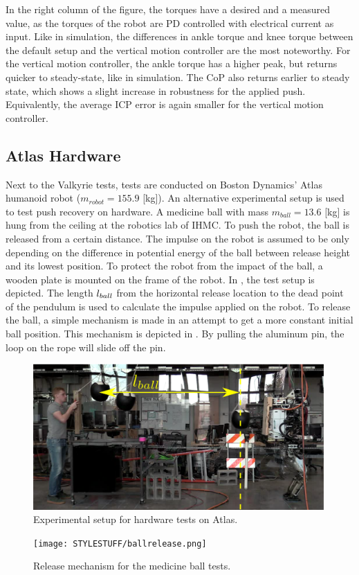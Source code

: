 In the right column of the figure, the torques have a desired and a measured value, as the torques of the robot are PD controlled with electrical current as input. Like in simulation, the differences in ankle torque and knee torque between the default setup and the vertical motion controller are the most noteworthy. For the vertical motion controller, the ankle torque has a higher peak, but returns quicker to steady-state, like in simulation.  The \ac{CoP} also returns earlier to steady state, which shows a slight increase in robustness for the applied push. Equivalently, the average \ac{ICP} error is again smaller for the vertical motion controller.

\subsection{Atlas Hardware}
Next to the Valkyrie tests, tests are conducted on Boston Dynamics' Atlas humanoid robot ($m_{robot}=155.9$ [kg]). An alternative experimental setup is used to test push recovery on hardware. A medicine ball with mass $m_{ball}=13.6$ [kg] is hung from the ceiling at the robotics lab of \ac{IHMC}. To push the robot, the ball is released from a certain distance. The impulse on the robot is assumed to be only depending on the difference in potential energy of the ball between release height and its lowest position. To protect the robot from the impact of the ball, a wooden plate is mounted on the frame of the robot. In , the test setup is depicted. The length $l_{ball}$ from the horizontal release location to the dead point of the pendulum is used to calculate the impulse applied on the robot. To release the ball, a simple mechanism is made in an attempt to get a more constant initial ball position. This mechanism is depicted in . By pulling the aluminum pin, the loop on the rope will slide off the pin.
\begin{figure}
\centering
\includegraphics[width=0.99\textwidth]{STYLESTUFF/atlassetup.png}
\caption{Experimental setup for hardware tests on Atlas.}
\label{fig:atlassetup}
\end{figure}
\begin{figure}
\centering
\texttt{[image: STYLESTUFF/ballrelease.png]}
\caption{Release mechanism for the medicine ball tests.}
\label{fig:ballrelease}
\end{figure}

